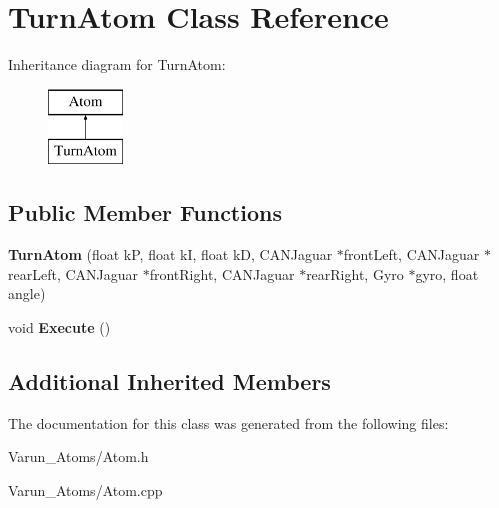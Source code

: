 \hypertarget{class_turn_atom}{\section{Turn\-Atom Class Reference}
\label{class_turn_atom}
}
Inheritance diagram for Turn\-Atom\-:\begin{figure}[H]
\begin{center}
\leavevmode
\includegraphics[height=2.000000cm]{class_turn_atom}
\end{center}
\end{figure}
\subsection*{Public Member Functions}
\begin{DoxyCompactItemize}
\item 
\hypertarget{class_turn_atom_adfc217157c5a658f963b1393f4903f5d}{{\bfseries Turn\-Atom} (float k\-P, float k\-I, float k\-D, C\-A\-N\-Jaguar $\ast$front\-Left, C\-A\-N\-Jaguar $\ast$rear\-Left, C\-A\-N\-Jaguar $\ast$front\-Right, C\-A\-N\-Jaguar $\ast$rear\-Right, Gyro $\ast$gyro, float angle)}\label{class_turn_atom_adfc217157c5a658f963b1393f4903f5d}

\item 
\hypertarget{class_turn_atom_ab8a0b59dd3d894aa1559f1a608a280e2}{void {\bfseries Execute} ()}\label{class_turn_atom_ab8a0b59dd3d894aa1559f1a608a280e2}

\end{DoxyCompactItemize}
\subsection*{Additional Inherited Members}


The documentation for this class was generated from the following files\-:\begin{DoxyCompactItemize}
\item 
Varun\-\_\-\-Atoms/Atom.\-h\item 
Varun\-\_\-\-Atoms/Atom.\-cpp\end{DoxyCompactItemize}
